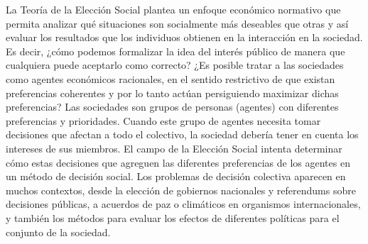 \documentclass[10pt,a4paper]{article}
\begin{document}
La Teoría de la Elección Social plantea un enfoque económico normativo que permita analizar qué situaciones son socialmente más deseables que otras y así evaluar los resultados que los individuos obtienen en la interacción en la sociedad. Es decir, ¿cómo podemos formalizar la idea del interés público de manera que cualquiera puede aceptarlo como correcto? ¿Es posible tratar a las sociedades como agentes económicos racionales, en el sentido restrictivo de que existan preferencias coherentes y por lo tanto actúan persiguiendo maximizar dichas preferencias? Las sociedades son grupos de personas (agentes) con diferentes preferencias y prioridades. Cuando este grupo de agentes necesita tomar decisiones que afectan a todo el colectivo, la sociedad debería tener en cuenta los intereses de sus miembros. El campo de la Elección Social intenta determinar cómo estas decisiones que agreguen las diferentes preferencias de los agentes en un método de decisión social. Los problemas de decisión colectiva aparecen en muchos contextos, desde la elección de gobiernos nacionales y referendums sobre decisiones públicas, a acuerdos de paz o climáticos en organismos internacionales, y también los métodos para evaluar los efectos de diferentes políticas para el conjunto de la sociedad.
\end{document}
